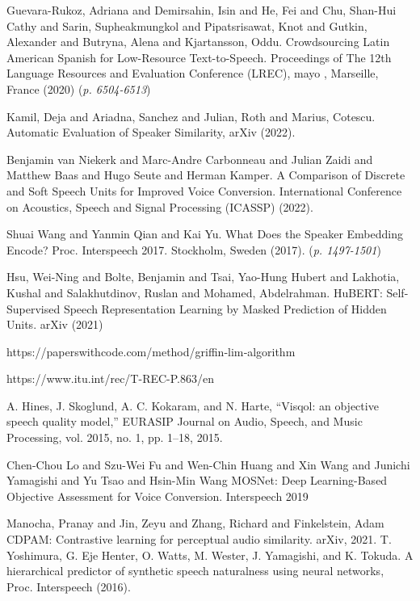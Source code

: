  Guevara-Rukoz, Adriana and Demirsahin, Isin and He, Fei and Chu, Shan-Hui Cathy and Sarin, Supheakmungkol and Pipatsrisawat, Knot and Gutkin, Alexander and Butryna, Alena and Kjartansson, Oddu. Crowdsourcing Latin American Spanish for Low-Resource Text-to-Speech. Proceedings of The 12th Language Resources and Evaluation Conference (LREC), mayo , Marseille, France (2020) (\textit{p. 6504-6513})

 Kamil, Deja and Ariadna, Sanchez and Julian, Roth and Marius, Cotescu. Automatic Evaluation of Speaker Similarity, arXiv (2022).

 Benjamin van Niekerk and Marc-Andre Carbonneau and Julian Zaidi and Matthew Baas and Hugo Seute and Herman Kamper. A Comparison of Discrete and Soft Speech Units for Improved Voice Conversion. International Conference on Acoustics, Speech and Signal Processing (ICASSP) (2022).

 Shuai Wang and Yanmin Qian and Kai Yu. What Does the Speaker Embedding Encode? Proc. Interspeech 2017. Stockholm, Sweden (2017). (\textit{p. 1497-1501})

 Hsu, Wei-Ning and Bolte, Benjamin and Tsai, Yao-Hung Hubert and Lakhotia, Kushal and Salakhutdinov, Ruslan and Mohamed, Abdelrahman. HuBERT: Self-Supervised Speech Representation Learning by Masked Prediction of Hidden Units. arXiv (2021)

 https://paperswithcode.com/method/griffin‐lim‐algorithm

 https://www.itu.int/rec/T-REC-P.863/en

 A. Hines, J. Skoglund, A. C. Kokaram, and N. Harte, “Visqol: an objective speech quality model,” EURASIP Journal on Audio, Speech, and Music Processing, vol. 2015, no. 1, pp. 1–18, 2015.

 Chen-Chou Lo and Szu-Wei Fu and Wen-Chin Huang and Xin Wang and Junichi Yamagishi and Yu Tsao and Hsin-Min Wang MOSNet: Deep Learning-Based Objective Assessment for Voice Conversion. Interspeech 2019

 Manocha, Pranay and Jin, Zeyu and Zhang, Richard and Finkelstein, Adam CDPAM: Contrastive learning for perceptual audio similarity. arXiv, 2021.
 T. Yoshimura, G. Eje Henter, O. Watts, M. Wester, J. Yamagishi, and K. Tokuda. A hierarchical predictor of synthetic speech naturalness using neural networks, Proc. Interspeech (2016).


